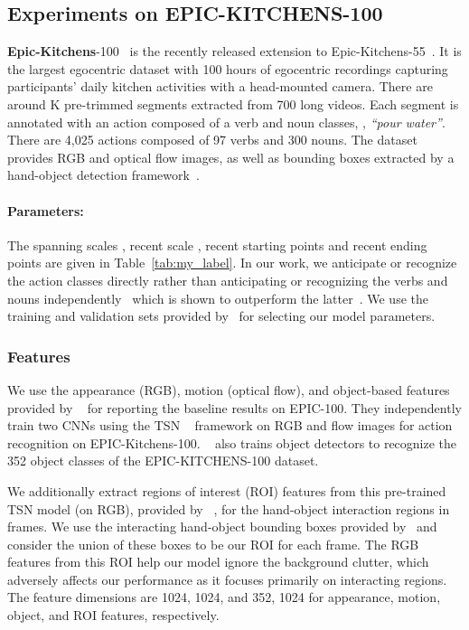 \documentclass[10pt,twocolumn,letterpaper]{article}
\begin{document}
\subsection{Experiments on EPIC-KITCHENS-100}
\textbf{Epic-Kitchens}-100~\cite{damen2020rescaling} is the recently released extension to Epic-Kitchens-55~\cite{damen2018scaling}.
It is the largest egocentric dataset with 100 hours of egocentric recordings capturing participants' daily kitchen activities with a head-mounted camera. 
There are around K pre-trimmed segments extracted from 700 long videos. Each segment is annotated with an action composed of a verb and noun classes, \eg, \emph{``pour water''}. 
There are 4,025 actions composed of 97 verbs and 300 nouns. 
The dataset provides RGB and optical flow images, as well as bounding boxes extracted by a hand-object detection framework~\cite{shan2020understanding}.


\paragraph{Parameters:} The spanning scales , recent scale , recent starting points  and recent ending points  are given in Table~\ref{tab:my_label}.
In our work, we anticipate or recognize the action classes directly rather than anticipating or recognizing the verbs and nouns independently~\cite{damen2018scaling} which is shown to outperform the latter~\cite{furnari2018leveraging}.
We use the training and validation sets provided by~\cite{damen2020rescaling} for selecting our model parameters.


\subsubsection{Features}
We use the appearance (RGB), motion (optical flow), and object-based features provided by ~\cite{furnari2019rulstm} for reporting the baseline results on EPIC-100.
They independently train two CNNs using the TSN ~\cite{wang2016temporal} framework on RGB and flow images for action recognition on EPIC-Kitchens-100. 
~\cite{furnari2019rulstm} also trains object detectors to recognize the 352 object classes of the EPIC-KITCHENS-100 dataset. 


We additionally extract regions of interest (ROI) features from this pre-trained TSN model (on RGB), provided by ~\cite{furnari2019rulstm}, for the hand-object interaction regions in frames. 
We use the interacting hand-object bounding boxes provided by~\cite{shan2020understanding} and consider the union of these boxes to be our ROI for each frame.
The RGB features from this ROI help our model ignore the background clutter, which adversely affects our performance as it focuses primarily on interacting regions.
The feature dimensions are 1024, 1024, and 352, 1024 for appearance, motion, object, and ROI features, respectively. 
\end{document}
